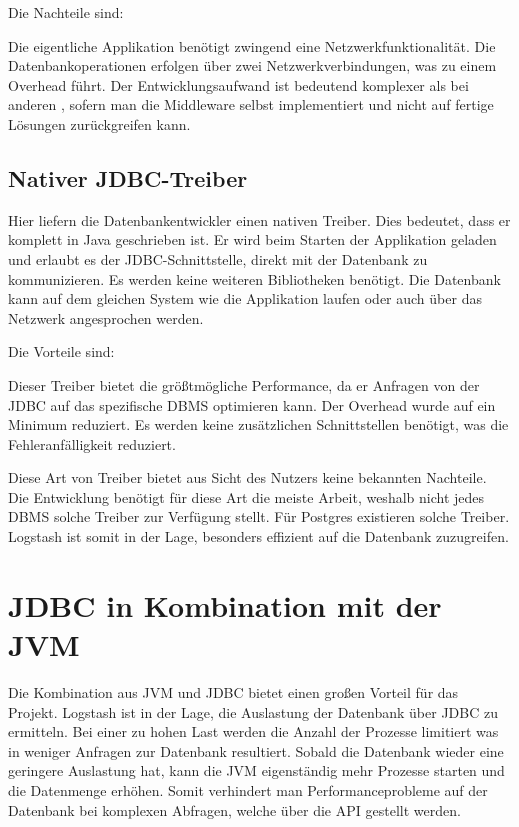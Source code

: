 Die Nachteile sind:

\begin{outline}
  \1 Die eigentliche Applikation benötigt zwingend eine Netzwerkfunktionalität.
  \1 Die Datenbankoperationen erfolgen über zwei Netzwerkverbindungen, was
  zu einem Overhead führt.
  \1 Der Entwicklungsaufwand ist bedeutend komplexer als bei anderen
  , sofern man die \gls{Middleware} selbst
  implementiert und nicht auf fertige Lösungen zurückgreifen kann.
\end{outline}
\tm%

\subsection{Nativer JDBC-Treiber}
Hier liefern die Datenbankentwickler einen nativen \gls{Treiber}. Dies
bedeutet, dass er komplett in Java geschrieben ist. Er wird beim Starten der
Applikation geladen und erlaubt es der \gls{JDBC}\hyp{}Schnittstelle, direkt
mit der Datenbank zu kommunizieren. Es werden keine weiteren Bibliotheken
benötigt. Die Datenbank kann auf dem gleichen System wie die Applikation laufen
oder auch über das Netzwerk angesprochen werden.

Die Vorteile sind:

\begin{outline}
  \1 Dieser \gls{Treiber} bietet die größtmögliche Performance, da er Anfragen
  von der \gls{JDBC} auf das spezifische \gls{DBMS} optimieren kann.
  \1 Der Overhead wurde auf ein Minimum reduziert.
  \1 Es werden keine zusätzlichen Schnittstellen benötigt, was die
  Fehleranfälligkeit reduziert.
\end{outline}

Diese Art von \gls{Treiber} bietet aus Sicht des Nutzers keine bekannten
Nachteile. Die Entwicklung benötigt für diese Art die meiste Arbeit, weshalb
nicht jedes \gls{DBMS} solche \gls{Treiber} zur Verfügung stellt. Für Postgres
existieren solche \gls{Treiber}. Logstash ist somit in der Lage, besonders
effizient auf die Datenbank zuzugreifen.
\tm%

\section{JDBC in Kombination mit der JVM}
Die Kombination aus \gls{JVM} und \gls{JDBC} bietet einen großen Vorteil für
das Projekt. Logstash ist in der Lage, die Auslastung der Datenbank über
\gls{JDBC} zu ermitteln. Bei einer zu hohen Last werden die Anzahl der Prozesse
limitiert was in weniger Anfragen zur Datenbank resultiert. Sobald die
Datenbank wieder eine geringere Auslastung hat, kann die \gls{JVM} eigenständig
mehr Prozesse starten und die Datenmenge erhöhen. Somit verhindert man
Performanceprobleme auf der Datenbank bei komplexen Abfragen, welche über die
\gls{API} gestellt werden.

